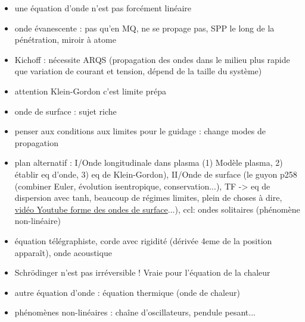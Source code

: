 \begin{remarques} \begin{itemize} 
\item une équation d'onde n'est pas forcément linéaire
\item onde évanescente : pas qu'en MQ, ne se propage pas, SPP le long de la pénétration, miroir à atome
\item Kichoff : nécessite ARQS (propagation des ondes dans le milieu plus rapide que variation de courant et tension, dépend de la taille du système)
\item attention Klein-Gordon c'est limite prépa
\item onde de surface : sujet riche
\item penser aux conditions aux limites pour le guidage : change modes de propagation
\item plan alternatif : I/Onde longitudinale dans plasma (1) Modèle plasma, 2) établir eq d'onde, 3) eq de Klein-Gordon), II/Onde de surface (le guyon p258 (combiner Euler, évolution isentropique, conservation...), TF -> eq de dispersion avec tanh, beaucoup de régimes limites, plein de choses à dire, \href{https://www.youtube.com/watch?v=95sQcSulRFM}{vidéo Youtube forme des ondes de surface}...), ccl: ondes solitaires (phénomène non-linéaire)
\item équation télégraphiste, corde avec rigidité (dérivée 4eme de la position apparaît), onde acoustique
\item Schrödinger n'est pas irréversible ! Vraie pour l'équation de la chaleur
\item autre équation d'onde : équation thermique (onde de chaleur)
\item phénomènes non-linéaires : chaîne d'oscillateurs, pendule pesant...
\end{itemize} \end{remarques}

	